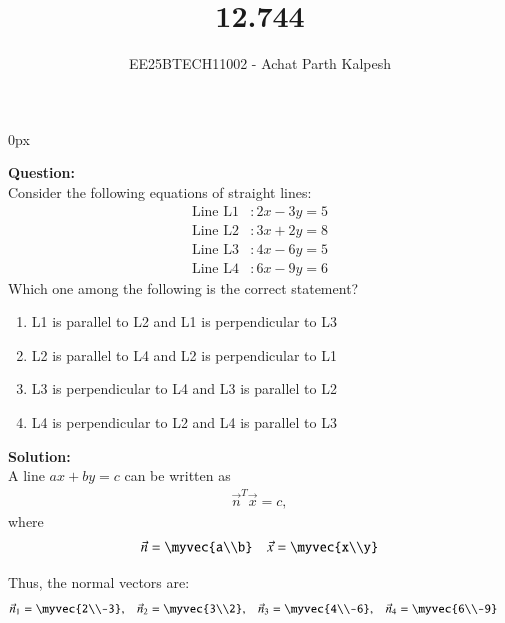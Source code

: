\documentclass[journal]{IEEEtran}
\begin{document}

\title{12.744}
\author{EE25BTECH11002 - Achat Parth Kalpesh }
{\let\newpage\relax\maketitle}
\renewcommand{\thefigure}{\theenumi}
\renewcommand{\thetable}{\theenumi}
\setlength{\intextsep}{10pt} %
\renewcommand{\thetable}{\theenumi}
\parindent 0px



\textbf{Question:}\\
Consider the following equations of straight lines:
\begin{align*}
	\text{Line L1} &\colon 2x - 3y = 5 \\
	\text{Line L2} &\colon 3x + 2y = 8 \\
	\text{Line L3} &\colon 4x - 6y = 5 \\
	\text{Line L4} &\colon 6x - 9y = 6
\end{align*}
Which one among the following is the correct statement?
\begin{enumerate}
	\item L1 is parallel to L2 and L1 is perpendicular to L3
	\item L2 is parallel to L4 and L2 is perpendicular to L1
	\item L3 is perpendicular to L4 and L3 is parallel to L2
	\item L4 is perpendicular to L2 and L4 is parallel to L3
\end{enumerate}

\textbf{Solution:}\\
A line $ax + by = c$ can be written as
\begin{align}
\vec{n}^T \vec{x} = c,
\end{align}
where
\begin{align}
\vec{n} = \myvec{a\\b} \quad
\vec{x} = \myvec{x\\y}
\end{align}

Thus, the normal vectors are:
\begin{align}
\vec{n}_1 &= \myvec{2\\-3}, &
\vec{n}_2 &= \myvec{3\\2}, &
\vec{n}_3 &= \myvec{4\\-6}, &
\vec{n}_4 &= \myvec{6\\-9}
\end{align}
\end{document}
